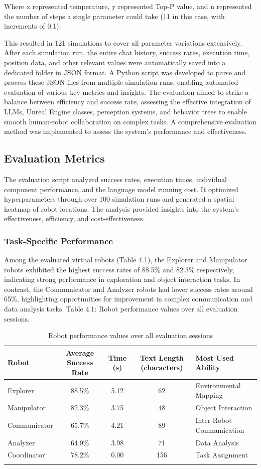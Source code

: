 \documentclass[pdflatex,sn-mathphys-num]{sn-jnl}%
\theoremstyle{thmstyleone}%
\theoremstyle{thmstyletwo}%
\theoremstyle{thmstylethree}%
\begin{document}
Where x represented temperature, y represented Top-P value, and n represented the number of steps a single parameter could take (11 in this case, with increments of 0.1):

This resulted in 121 simulations to cover all parameter variations extensively.
After each simulation run, the entire chat history, success rates, execution time, position data, and other relevant values were automatically saved into a dedicated folder in JSON format. A Python script was developed to parse and process these JSON files from multiple simulation runs, enabling automated evaluation of various key metrics and insights.
The evaluation aimed to strike a balance between efficiency and success rate, assessing the effective integration of LLMs, Unreal Engine classes, perception systems, and behavior trees to enable smooth human-robot collaboration on complex tasks. A comprehensive evaluation method was implemented to assess the system's performance and effectiveness.
\subsection{Evaluation Metrics}
The evaluation script analyzed success rates, execution times, individual component performance, and the language model running cost. It optimized hyperparameters through over 100 simulation runs and generated a spatial heatmap of robot locations. The analysis provided insights into the system's effectiveness, efficiency, and cost-effectiveness.
\subsubsection{Task-Specific Performance}
Among the evaluated virtual robots (Table 4.1), the Explorer and Manipulator robots exhibited the highest success rates of 88.5\% and 82.3\% respectively, indicating strong performance in exploration and object interaction tasks. In contrast, the Communicator and Analyzer robots had lower success rates around 65\%, highlighting opportunities for improvement in complex communication and data analysis tasks.
Table 4.1: Robot performance values over all evaluation sessions.
\begin{table}[h]
\caption{Robot performance values over all evaluation sessions}\label{tab1}
\begin{tabular*}{\textwidth}{@{\extracolsep\fill}lcccl}
\toprule
Robot & Average Success Rate & Time (s) & Text Length (characters) & Most Used Ability \\
\midrule
Explorer & 88.5\% & 5.12 & 62 & Environmental Mapping \\
Manipulator & 82.3\% & 3.75 & 48 & Object Interaction \\
Communicator & 65.7\% & 4.21 & 89 & Inter-Robot Communication \\
Analyzer & 64.9\% & 3.98 & 71 & Data Analysis \\
Coordinator & 78.2\% & 0.00 & 156 & Task Assignment \\
\botrule
\end{tabular*}
\end{table}
\end{document}
